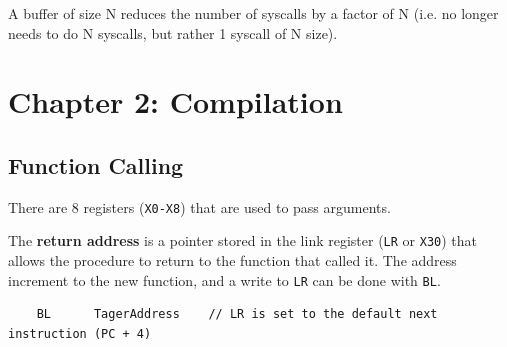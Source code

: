 \documentclass[11pt]{article}
\begin{document}
A buffer of size N reduces the number of syscalls by a factor of N (i.e. no longer needs to do N syscalls, but rather 1 syscall of N size).

\section*{Chapter 2: Compilation}

\subsection*{Function Calling}

There are 8 registers (\texttt{X0-X8}) that are used to pass arguments.

The \textbf{return address} is a pointer stored in the link register (\texttt{LR} or \texttt{X30}) that allows the procedure to return to the function that called it. The address increment to the new function, and a write to \texttt{LR} can be done with \texttt{BL}.

\begin{verbatim}
    BL      TagerAddress    // LR is set to the default next instruction (PC + 4)
\end{verbatim}
\end{document}
